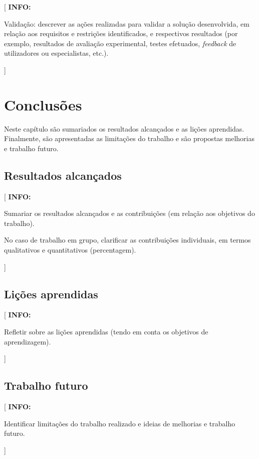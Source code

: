 \documentclass[11pt,a4paper]{report}
\newenvironment{info}[1]{\vspace*{6mm}\color{blue}[ \textbf{INFO:} \begin{em} #1}
                        {\vspace*{3mm}\end{em} ]}
\begin{document}
\begin{info}
Validação: descrever as ações realizadas para validar a solução
desenvolvida, em relação aos requisitos e restrições identificados, e 
respectivos resultados (por exemplo, resultados de avaliação
experimental, testes efetuados, \emph{feedback} de utilizadores ou
especialistas, etc.). 
\end{info}


\chapter{Conclusões}

Neste capítulo são sumariados os resultados alcançados e as lições
aprendidas.
Finalmente, são apresentadas as limitações do trabalho e são propostas
melhorias e trabalho futuro. 

\section{Resultados alcançados}

\begin{info}
Sumariar os resultados alcançados e as contribuições (em
relação aos objetivos do trabalho).

No caso de trabalho em grupo, clarificar as contribuições individuais,
em termos qualitativos e quantitativos (percentagem). 
\end{info}

\lipsum[11]

\section{Lições aprendidas}

\begin{info}
Refletir sobre as lições aprendidas (tendo em conta os objetivos de aprendizagem).
\end{info}

\lipsum[12]

\section{Trabalho futuro}

\begin{info}
Identificar limitações do trabalho realizado e ideias de melhorias e trabalho futuro.
\end{info}
\end{document}
